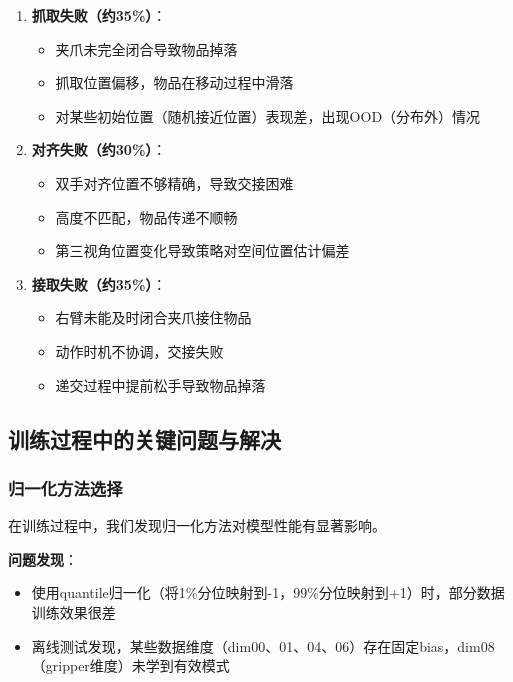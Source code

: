 \begin{enumerate}[leftmargin=2em]
    \item \textbf{抓取失败（约35\%）}：
    \begin{itemize}
        \item 夹爪未完全闭合导致物品掉落
        \item 抓取位置偏移，物品在移动过程中滑落
        \item 对某些初始位置（随机接近位置）表现差，出现OOD（分布外）情况
    \end{itemize}
    
    \item \textbf{对齐失败（约30\%）}：
    \begin{itemize}
        \item 双手对齐位置不够精确，导致交接困难
        \item 高度不匹配，物品传递不顺畅
        \item 第三视角位置变化导致策略对空间位置估计偏差
    \end{itemize}
    
    \item \textbf{接取失败（约35\%）}：
    \begin{itemize}
        \item 右臂未能及时闭合夹爪接住物品
        \item 动作时机不协调，交接失败
        \item 递交过程中提前松手导致物品掉落
    \end{itemize}
\end{enumerate}

\subsection{训练过程中的关键问题与解决}

\subsubsection{归一化方法选择}

在训练过程中，我们发现归一化方法对模型性能有显著影响。

\textbf{问题发现}：
\begin{itemize}[leftmargin=2em]
    \item 使用quantile归一化（将1\%分位映射到-1，99\%分位映射到+1）时，部分数据训练效果很差
    \item 离线测试发现，某些数据维度（dim00、01、04、06）存在固定bias，dim08（gripper维度）未学到有效模式
\end{itemize}

